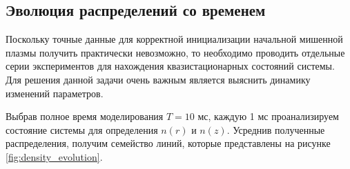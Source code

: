 \subsection{Эволюция распределений со временем}

Поскольку точные данные для корректной инициализации начальной мишенной плазмы получить практически невозможно, то необходимо проводить отдельные серии экспериментов для нахождения квазистационарных состояний системы. Для решения данной задачи очень важным является выяснить динамику изменений параметров.

Выбрав полное время моделирования $T = 10 \text{ мс}$, каждую 1 мс проанализируем состояние системы для определения $n(r)$ и $n(z)$. Усреднив полученные распределения, получим семейство линий, которые представлены на рисунке \ref{fig:density_evolution}.


